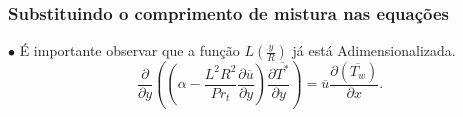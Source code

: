 \documentclass[xcolor=dvipsnames,10pt,aspectratio=169]{beamer}
\begin{document}
		
		
		
		
		\begin{frame}
			\frametitle{Substituindo o comprimento de mistura nas equações}
			$\bullet$ É importante observar que a função $ L(\frac{y}{R}) $ já está Adimensionalizada.
				\begin{equation}
				{\frac{\partial{}}{\partial{y}}} \left( \left( \alpha   
				- \frac{{L}^2 R ^2}{Pr_t}\frac{\partial \overline{u}}{\partial y} \right) \frac{\partial \overline{T^\ast}}{\partial y} \right)
				= 
				\overline{u}\frac{\partial{}\left(\overline{T_w}\right)  }{\partial{x}}.
				\end{equation}
		\end{frame}
		
		
		
		
		
			
\end{document}
